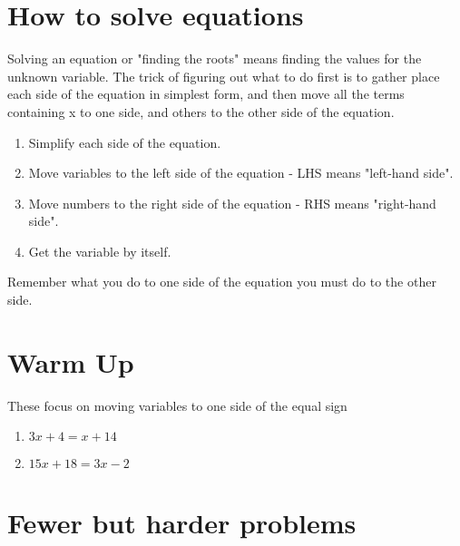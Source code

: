 \documentclass[12pt,letterpaper]{article}
\begin{document}
\section*{How to solve equations}
\begin{large}

Solving an equation or "finding the roots" means finding the values for the unknown variable.
The trick of figuring out what to do first is to gather place each side of the equation
in simplest form, and then move all the terms containing x to one side, and others to 
the other side of the equation.

\begin{enumerate}
	\item Simplify each side of the equation.
	\item Move variables to the left side of the equation - LHS means "left-hand side".
	\item Move numbers to the right side of the equation - RHS means "right-hand side".
	\item Get the variable by itself.
\end{enumerate}

\noindent Remember what you do to one side of the equation you must do to the other side.
\end{large}

\pagebreak

\section*{Warm Up}
\begin{large}
{These focus on moving variables to one side of the equal sign}
\begin{enumerate}
\item \quad $3x + 4 =  x + 14$

\addvspace{0.6in}

\item \quad $15x + 18 = 3x - 2$

\addvspace{0.6in}

\end{enumerate}
\end{large}

\section*{Fewer but harder problems}
\end{document}
